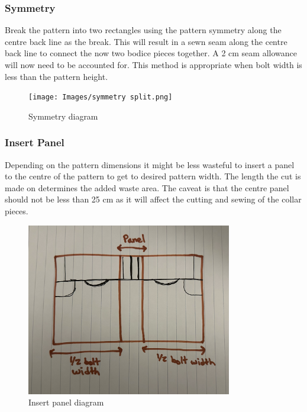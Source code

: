 \subsubsection{Symmetry}
Break the pattern into two rectangles using the pattern symmetry along the centre back line as the break. This will result in a sewn seam along the centre back line to connect the now two bodice pieces together. A 2 cm seam allowance will now need to be accounted for. This method is appropriate when bolt width is less than the pattern height.
\begin{figure} [H] %
    \centering %
    \texttt{[image: Images/symmetry split.png]} %
    \caption{Symmetry diagram}
\end{figure}
\subsubsection{Insert Panel}
Depending on the pattern dimensions it might be less wasteful to insert a panel to the centre of the pattern to get to desired pattern width. The length the cut is made on determines the added waste area.
The caveat is that the centre panel should not be less than 25 cm as it will affect the cutting and sewing of the collar pieces.
\begin{figure} [H] %
    \centering %
    \includegraphics[width = 0.8\textwidth, angle=90]{Images/added panel.png} %
    \caption{Insert panel diagram}
\end{figure}
